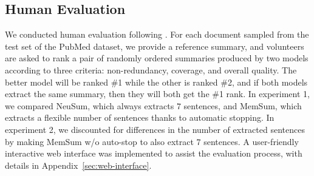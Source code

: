\documentclass[11pt]{article}
\begin{document}
\subsection{Human Evaluation}
\label{sec:human-evaluation}
We conducted human evaluation following \citet{DBLP:journals/corr/abs-1804-07036,dong2018banditsum,luo2019reading}.
For each document sampled from the test set of the PubMed dataset, we provide a reference summary, and volunteers are asked to rank a pair of randomly ordered summaries produced by two models according to three criteria: non-redundancy, coverage, and overall quality. The better model will be ranked \#1 while the other is ranked \#2, and if both models extract the same summary, then they will both get the \#1 rank. In experiment 1, we compared NeuSum, which always extracts $7$ sentences, and MemSum, which extracts a flexible number of sentences thanks to automatic stopping. In experiment 2, we discounted for differences in the number of extracted sentences by making MemSum w/o auto-stop to also extract $7$ sentences.
A user-friendly interactive web interface was implemented to assist the evaluation process, with details in Appendix~\ref{sec:web-interface}.










\begin{table}
\centering
{}
\caption{ \label{tab:res_human_evaluation} The average ranking of NeuSum and MemSum is reported. The smaller the ranking, the better the model. Four volunteers participated in these experiments, and evaluated 67 and 63 pairs of summaries in Experiment 1 and 2, respectively. ``*'' indicates statistical significance (p<0.005) in a Wilcoxon signed-rank test \cite{Woolson2007}. }

\end{table}
\end{document}
